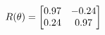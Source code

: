 \documentclass[preview]{standalone}
\begin{document}
\begin{align*}
\special{dvisvgm:raw <g id='unique000'>}R(\theta) = \begin{bmatrix}0.97 & -0.24\\0.24 & 0.97\end{bmatrix}\special{dvisvgm:raw </g>}
\end{align*}
\end{document}
